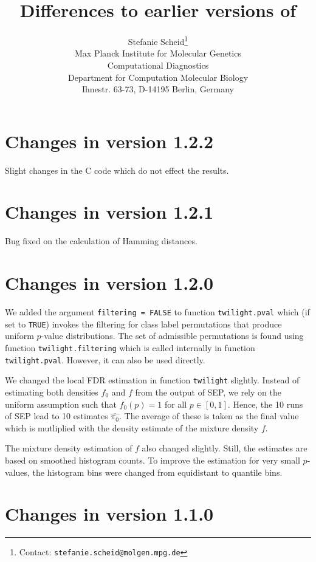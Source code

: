 \documentclass[11pt,a4paper,fleqn]{article}
\title{Differences to earlier versions of \Rpackage{twilight}}
\author{Stefanie Scheid\footnote{Contact:
        \texttt{stefanie.scheid@molgen.mpg.de}}\bigskip \\
        Max Planck Institute for Molecular Genetics\\
         Computational Diagnostics\\ Department for Computation Molecular Biology \\
         Ihnestr. 63-73, D-14195 Berlin, Germany}
\date{}
\newcommand{\Rfunction}[1]{{\texttt{#1}}}
\newcommand{\Rfunarg}[1]{{\texttt{#1}}}
\begin{document}
\maketitle

\section{Changes in version 1.2.2}

Slight changes in the C code which do not effect the results.


\section{Changes in version 1.2.1}

Bug fixed on the calculation of Hamming distances.


\section{Changes in version 1.2.0}

We added the argument \Rfunarg{filtering = FALSE} to function \Rfunction{twilight.pval} which (if set to \Rfunarg{TRUE}) invokes the filtering for class label permutations that produce uniform $p$-value distributions. The set of admissible permutations is found using function \Rfunarg{twilight.filtering} which is called internally in function \Rfunarg{twilight.pval}. However, it can also be used directly.

We changed the local FDR estimation in function \Rfunction{twilight} slightly. Instead of estimating both densities $f_0$ and $f$ from the output of SEP, we rely on the uniform assumption such that $f_0(p)=1$ for all $p \in [0,1]$. Hence, the 10 runs of SEP lead to 10 estimates $\widehat{\pi_0}$. The average of these is taken as the final value which is mutliplied with the density estimate of the mixture density $f$.

The mixture density estimation of $f$ also changed slightly. Still, the estimates are based on smoothed histogram counts. To improve the estimation for very small $p$-values, the histogram bins were changed from equidistant to quantile bins.


\section{Changes in version 1.1.0}
\end{document}
